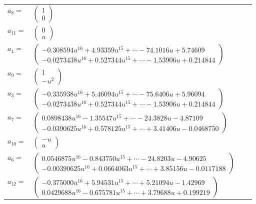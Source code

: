 \documentclass[1p]{elsarticle_modified}
\theoremstyle{definition}
\begin{document}
\begin{tabular}{m{7pt} m{180pt} m{7pt} m{180pt} }
\flushright $a_{8}=$&$\begin{pmatrix}1\\0\end{pmatrix}$ \\
\flushright $a_{11}=$&$\begin{pmatrix}0\\u\end{pmatrix}$ \\
\flushright $a_{4}=$&$\begin{pmatrix}-0.308594 u^{16}+4.93359 u^{15}+\cdots-74.1016 u+5.74609\\-0.0273438 u^{16}+0.527344 u^{15}+\cdots-1.53906 u+0.214844\end{pmatrix}$ \\
\flushright $a_{9}=$&$\begin{pmatrix}1\\- u^2\end{pmatrix}$ \\
\flushright $a_{3}=$&$\begin{pmatrix}-0.335938 u^{16}+5.46094 u^{15}+\cdots-75.6406 u+5.96094\\-0.0273438 u^{16}+0.527344 u^{15}+\cdots-1.53906 u+0.214844\end{pmatrix}$ \\
\flushright $a_{7}=$&$\begin{pmatrix}0.0898438 u^{16}-1.35547 u^{15}+\cdots-24.3828 u-4.87109\\-0.0390625 u^{16}+0.578125 u^{15}+\cdots+3.41406 u-0.0468750\end{pmatrix}$ \\
\flushright $a_{10}=$&$\begin{pmatrix}- u\\u\end{pmatrix}$ \\
\flushright $a_{6}=$&$\begin{pmatrix}0.0546875 u^{16}-0.843750 u^{15}+\cdots-24.8203 u-4.90625\\-0.00390625 u^{16}+0.0664063 u^{15}+\cdots+3.85156 u-0.0117188\end{pmatrix}$ \\
\flushright $a_{12}=$&$\begin{pmatrix}-0.375000 u^{16}+5.94531 u^{15}+\cdots+5.21094 u-1.42969\\0.0429688 u^{16}-0.675781 u^{15}+\cdots+3.79688 u+0.199219\end{pmatrix}$ \\

\end{tabular}
\end{document}
